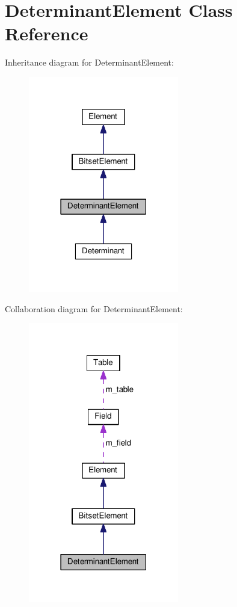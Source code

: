 \hypertarget{classDeterminantElement}{}\section{Determinant\+Element Class Reference}
\label{classDeterminantElement}


Inheritance diagram for Determinant\+Element\+:\nopagebreak
\begin{figure}[H]
\begin{center}
\leavevmode
\includegraphics[width=186pt]{classDeterminantElement__inherit__graph}
\end{center}
\end{figure}


Collaboration diagram for Determinant\+Element\+:\nopagebreak
\begin{figure}[H]
\begin{center}
\leavevmode
\includegraphics[width=186pt]{classDeterminantElement__coll__graph}
\end{center}
\end{figure}
